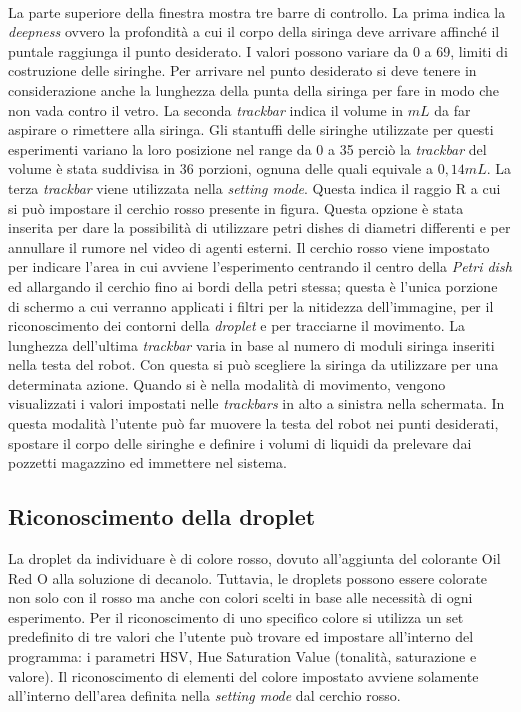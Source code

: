 \\La parte superiore della finestra mostra tre barre di controllo. La prima indica la \emph{deepness} ovvero la profondità a cui il corpo della siringa deve arrivare affinché il puntale raggiunga il punto desiderato. I valori possono variare da 0 a 69, limiti di costruzione delle siringhe. Per arrivare nel punto desiderato si deve tenere in considerazione anche la lunghezza della punta della siringa per fare in modo che non vada contro il vetro. La seconda \emph{trackbar} indica il volume in $mL$ da far aspirare o rimettere alla siringa. Gli stantuffi delle siringhe utilizzate per questi esperimenti variano la loro posizione nel range da 0 a 35 perciò la \emph{trackbar} del volume è stata suddivisa in 36 porzioni, ognuna delle quali equivale a $0,14mL$. La terza \emph{trackbar} viene utilizzata nella \emph{setting mode}. Questa indica il raggio R a cui si può impostare il cerchio rosso presente in figura. Questa opzione è stata inserita per dare la possibilità di utilizzare petri dishes di diametri differenti e per annullare il rumore nel video di agenti esterni. Il cerchio rosso viene impostato per indicare l'area in cui avviene l'esperimento centrando il centro della \emph{Petri dish} ed allargando il cerchio fino ai bordi della petri stessa; questa è l'unica porzione di schermo a cui verranno applicati i filtri per la nitidezza dell'immagine, per il riconoscimento dei contorni della \emph{droplet} e per tracciarne il movimento.
La lunghezza dell'ultima \emph{trackbar} varia in base al numero di moduli siringa inseriti nella testa del robot. Con questa si può scegliere la siringa da utilizzare per una determinata azione. Quando si è nella modalità di movimento, vengono visualizzati i valori impostati nelle \emph{trackbars} in alto a sinistra nella schermata. In questa modalità l'utente può far muovere la testa del robot nei punti desiderati, spostare il corpo delle siringhe e definire i volumi di liquidi da prelevare dai pozzetti magazzino ed immettere nel sistema.  
 
\subsection{Riconoscimento della droplet}
La droplet da individuare è di colore rosso, dovuto all'aggiunta del colorante Oil Red O alla soluzione di decanolo. Tuttavia, le droplets possono essere colorate non solo con il rosso ma anche con colori scelti in base alle necessità di ogni esperimento. Per il riconoscimento di uno specifico colore si utilizza un set predefinito di tre valori che l'utente può trovare ed impostare all'interno del programma: i parametri HSV, Hue Saturation Value (tonalità, saturazione e valore). Il riconoscimento di elementi del colore impostato avviene solamente all'interno dell'area definita nella \emph{setting mode} dal cerchio rosso. 

